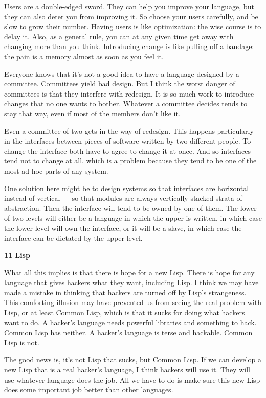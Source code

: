 \documentclass[12pt]{book}
\begin{document}
Users are a double-edged sword. They can help you improve your language,
but they can also deter you from improving it. So choose your users
carefully, and be slow to grow their number. Having users is like
optimization: the wise course is to delay it. Also, as a general rule,
you can at any given time get away with changing more than you think.
Introducing change is like pulling off a bandage: the pain is a memory
almost as soon as you feel it.

Everyone knows that it's not a good idea to have a language designed by
a committee. Committees yield bad design. But I think the worst danger
of committees is that they interfere with redesign. It is so much work
to introduce changes that no one wants to bother. Whatever a committee
decides tends to stay that way, even if most of the members don't like
it.

Even a committee of two gets in the way of redesign. This happens
particularly in the interfaces between pieces of software written by two
different people. To change the interface both have to agree to change
it at once. And so interfaces tend not to change at all, which is a
problem because they tend to be one of the most ad hoc parts of any
system.

One solution here might be to design systems so that interfaces are
horizontal instead of vertical --- so that modules are always vertically
stacked strata of abstraction. Then the interface will tend to be owned
by one of them. The lower of two levels will either be a language in
which the upper is written, in which case the lower level will own the
interface, or it will be a slave, in which case the interface can be
dictated by the upper level.

\textbf{11 Lisp}

What all this implies is that there is hope for a new Lisp. There is
hope for any language that gives hackers what they want, including Lisp.
I think we may have made a mistake in thinking that hackers are turned
off by Lisp's strangeness. This comforting illusion may have prevented
us from seeing the real problem with Lisp, or at least Common Lisp,
which is that it sucks for doing what hackers want to do. A hacker's
language needs powerful libraries and something to hack. Common Lisp has
neither. A hacker's language is terse and hackable. Common Lisp is not.

The good news is, it's not Lisp that sucks, but Common Lisp. If we can
develop a new Lisp that is a real hacker's language, I think hackers
will use it. They will use whatever language does the job. All we have
to do is make sure this new Lisp does some important job better than
other languages.
\end{document}
